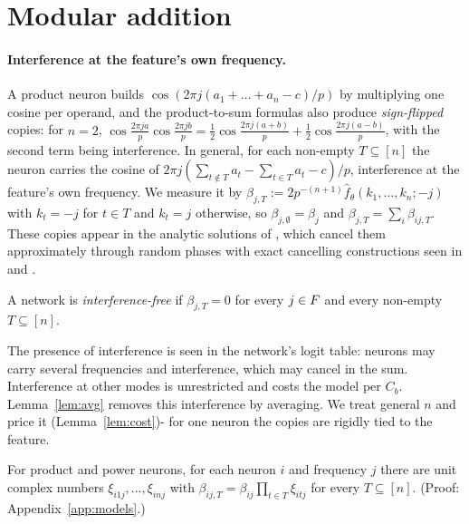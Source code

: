 \section{Modular addition}\label{sec:cyclic}


\paragraph{Interference at the feature's own frequency.}
A product neuron builds $\cos(2\pi j(a_1+\dots+a_n-c)/p)$ by multiplying one cosine per operand, and the product-to-sum formulas also produce \emph{sign-flipped} copies: for $n=2$, $\cos\frac{2\pi ja}p\cos\frac{2\pi jb}p=\frac12\cos\frac{2\pi j(a+b)}p+\frac12\cos\frac{2\pi j(a-b)}p$, with the second term being interference. In general, for each non-empty $T\subseteq[n]$ the neuron carries the cosine of $2\pi j(\sum_{t\notin T}a_t-\sum_{t\in T}a_t-c)/p$, interference at the feature's own frequency. We measure it by $\beta_{j,T}:=2p^{-(n+1)}\hat f_\theta(k_1,\dots,k_n;-j)$ with $k_t=-j$ for $t\in T$ and $k_t=j$ otherwise, so $\beta_{j,\emptyset}=\beta_j$ and $\beta_{j,T}=\sum_i\beta_{ij,T}$. These copies appear in the analytic solutions of \citet[Eqs.~10--11]{gromov2023grokking}, which cancel them approximately through random phases with exact cancelling constructions seen in \citet[App.~F.2]{morwani2024feature} and \citet[App.~E]{li2025nsum}.

\begin{definition}\label{def:if}
A network is \emph{interference-free} if $\beta_{j,T}=0$ for every $j\in F$ and every non-empty $T\subseteq[n]$.
\end{definition}

The presence of interference is seen in the network's logit table: neurons may carry several frequencies and interference, which may cancel in the sum. Interference at other modes is unrestricted and costs the model per $C_b$. Lemma~\ref{lem:avg} removes this interference by averaging. We treat general $n$ and price it (Lemma~\ref{lem:cost})- for one neuron the copies are rigidly tied to the feature.

\begin{lemma}[]\label{lem:sign}
For product and power neurons, for each neuron $i$ and frequency $j$ there are unit complex numbers $\xi_{i1j},\dots,\xi_{inj}$ with $\beta_{ij,T}=\beta_{ij}\prod_{t\in T}\xi_{itj}$ for every $T\subseteq[n]$. (Proof: Appendix~\ref{app:models}.)
\end{lemma}


